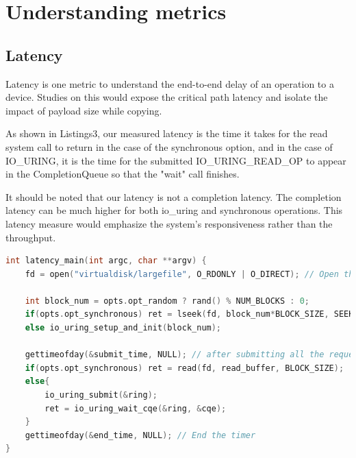 \documentclass{article}
\begin{document}
\section{Understanding metrics}
\subsection{Latency}
Latency is one metric to understand the end-to-end delay of an operation to a device. Studies on this would expose the critical 
path latency and isolate the impact of payload size while copying.

As shown in Listings3, our measured latency is the time it takes for the read system call to return in the case of the 
synchronous option, and in the case of IO\_URING, it is the time for the submitted IO\_URING\_READ\_OP to appear in the 
CompletionQueue so that the "wait" call finishes. 

It should be noted that our latency is not a completion latency. The completion latency can be much higher for both io\_uring 
and synchronous operations. This latency measure would emphasize the system's responsiveness rather than the throughput. 

\begin{lstlisting}[language=C, caption=Latency of Concerned Operations shown in the Psedocode, basicstyle=\tiny]
int latency_main(int argc, char **argv) {
    fd = open("virtualdisk/largefile", O_RDONLY | O_DIRECT); // Open the file

    int block_num = opts.opt_random ? rand() % NUM_BLOCKS : 0;
    if(opts.opt_synchronous) ret = lseek(fd, block_num*BLOCK_SIZE, SEEK_SET);
    else io_uring_setup_and_init(block_num);

    gettimeofday(&submit_time, NULL); // after submitting all the request
    if(opts.opt_synchronous) ret = read(fd, read_buffer, BLOCK_SIZE);
    else{
        io_uring_submit(&ring); 
        ret = io_uring_wait_cqe(&ring, &cqe);
    }
    gettimeofday(&end_time, NULL); // End the timer
}
\end{lstlisting}
\end{document}
